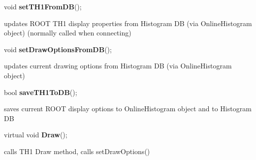 \item    void {\bf setTH1FromDB}();


 updates ROOT TH1 display properties from Histogram DB (via OnlineHistogram object) 
 (normally called when connecting)


\item    void {\bf setDrawOptionsFromDB}();


 updates current drawing options from Histogram DB (via OnlineHistogram object)


\item    bool {\bf saveTH1ToDB}();


 saves current ROOT display options to OnlineHistogram object and to Histogram DB


\item    virtual void {\bf Draw}();


 calls TH1 Draw method, calls setDrawOptions()


